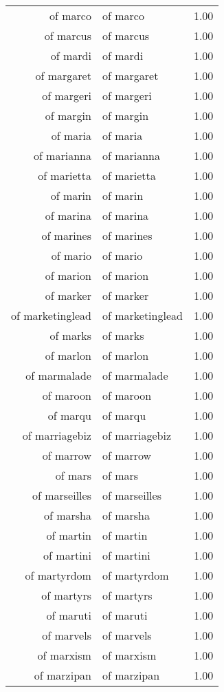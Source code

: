 \begin{table}[ht]
\begin{tabular}{rlr}
  of marco & of marco & 1.00 \\ 
  of marcus & of marcus & 1.00 \\ 
  of mardi & of mardi & 1.00 \\ 
  of margaret & of margaret & 1.00 \\ 
  of margeri & of margeri & 1.00 \\ 
  of margin & of margin & 1.00 \\ 
  of maria & of maria & 1.00 \\ 
  of marianna & of marianna & 1.00 \\ 
  of marietta & of marietta & 1.00 \\ 
  of marin & of marin & 1.00 \\ 
  of marina & of marina & 1.00 \\ 
  of marines & of marines & 1.00 \\ 
  of mario & of mario & 1.00 \\ 
  of marion & of marion & 1.00 \\ 
  of marker & of marker & 1.00 \\ 
  of marketinglead & of marketinglead & 1.00 \\ 
  of marks & of marks & 1.00 \\ 
  of marlon & of marlon & 1.00 \\ 
  of marmalade & of marmalade & 1.00 \\ 
  of maroon & of maroon & 1.00 \\ 
  of marqu & of marqu & 1.00 \\ 
  of marriagebiz & of marriagebiz & 1.00 \\ 
  of marrow & of marrow & 1.00 \\ 
  of mars & of mars & 1.00 \\ 
  of marseilles & of marseilles & 1.00 \\ 
  of marsha & of marsha & 1.00 \\ 
  of martin & of martin & 1.00 \\ 
  of martini & of martini & 1.00 \\ 
  of martyrdom & of martyrdom & 1.00 \\ 
  of martyrs & of martyrs & 1.00 \\ 
  of maruti & of maruti & 1.00 \\ 
  of marvels & of marvels & 1.00 \\ 
  of marxism & of marxism & 1.00 \\ 
  of marzipan & of marzipan & 1.00 \\ 

\end{tabular}
\end{table}
